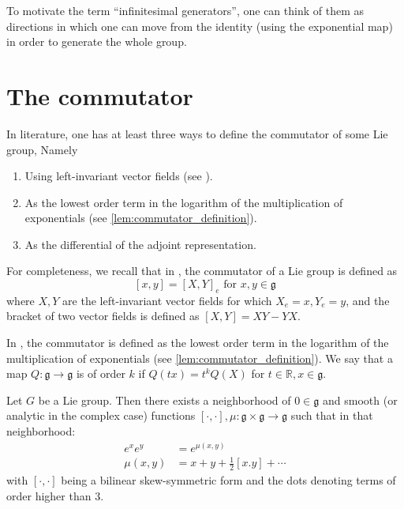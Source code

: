 \documentclass{report}
\begin{document}
\begin{remark}
    To motivate the term ``inﬁnitesimal generators'', one can think of them as directions in which one can move from the identity (using the exponential map) in order to generate the whole group.
\end{remark}

\section{The commutator}
In literature, one has at least three ways to define the commutator of some Lie group, Namely
\begin{enumerate}[label = (\roman*)]
    \item Using left-invariant vector fields (see \cite{lee2018introduction}).
    \item As the lowest order term in the logarithm of the multiplication of exponentials (see \cref{lem:commutator_definition}).
    \item As the differential of the adjoint representation.
\end{enumerate}

For completeness, we recall that in \cite{lee2018introduction}, the commutator of a Lie group is defined as
\[
[x,y] = [X,Y]_e \text{ for } x,y \in \mathfrak g
\]
where $X,Y$ are the left-invariant vector fields for which $X_e = x, Y_e = y$, and the bracket of two vector fields is defined as $[X,Y] = XY - YX$.

In \cite{kirillov2008introduction}, the commutator is defined as the lowest order term in the logarithm of the multiplication of exponentials (see \cref{lem:commutator_definition}).
We say that a map $Q:\mathfrak g \to \mathfrak g$ is of order $k$ if $Q(t x) = t^k Q(X)$ for $t \in \mathbb R, x \in \mathfrak g$.
\begin{lemma}\label{lem:commutator_definition}
    Let $G$ be a Lie group.
    Then there exists a neighborhood of $0 \in \mathfrak g$ and smooth (or analytic in the complex case) functions $[\cdot, \cdot], \mu: \mathfrak g \times \mathfrak g \to \mathfrak g$ such that in that neighborhood:
    \begin{align*}
        e^x e^y &= e^{\mu(x,y)}\\
        \mu(x,y) &= x + y + \frac{1}{2}[x.y] + \cdots
    \end{align*}
    with $[\cdot, \cdot]$ being a bilinear skew-symmetric form and the dots denoting terms of order higher than $3$.
\end{lemma}
\end{document}
